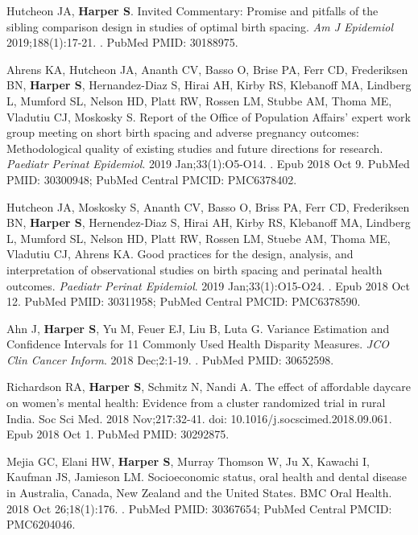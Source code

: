\documentclass[
  letterpaper,
  DIV=11,
  numbers=noendperiod]{scrartcl}
\begin{document}
\begin{etaremune}
\item Hutcheon JA, \textbf{Harper S}. Invited Commentary: Promise and pitfalls of the sibling comparison design in studies of optimal birth spacing. \emph{Am J Epidemiol} 2019;188(1):17-21. . PubMed PMID: 30188975.

\item Ahrens KA, Hutcheon JA, Ananth CV, Basso O, Brise PA, Ferr CD, Frederiksen BN, \textbf{Harper S}, Hernandez-Diaz S, Hirai AH, Kirby RS, Klebanoff MA, Lindberg L, Mumford SL, Nelson HD, Platt RW, Rossen LM, Stubbe AM, Thoma ME, Vladutiu CJ, Moskosky S. Report of the Office of Population Affairs' expert work group meeting on short birth spacing and adverse pregnancy outcomes: Methodological quality of existing studies and future directions for research. \emph{Paediatr Perinat Epidemiol}. 2019 Jan;33(1):O5-O14. . Epub 2018 Oct 9. PubMed PMID: 30300948; PubMed Central PMCID: PMC6378402.

\item Hutcheon JA, Moskosky S, Ananth CV, Basso O, Briss PA, Ferr CD, Frederiksen BN, \textbf{Harper S}, Hernendez-Diaz S, Hirai AH, Kirby RS, Klebanoff MA, Lindberg L, Mumford SL, Nelson HD, Platt RW, Rossen LM, Stuebe AM, Thoma ME, Vladutiu CJ, Ahrens KA. Good practices for the design, analysis, and interpretation of observational studies on birth spacing and perinatal health outcomes. \emph{Paediatr Perinat Epidemiol}. 2019 Jan;33(1):O15-O24. . Epub 2018 Oct 12. PubMed PMID: 30311958; PubMed Central PMCID: PMC6378590.

\item Ahn J, \textbf{Harper S}, Yu M, Feuer EJ, Liu B, Luta G. Variance Estimation and Confidence Intervals for 11 Commonly Used Health Disparity Measures. \emph{JCO Clin Cancer Inform}. 2018 Dec;2:1-19. . PubMed PMID: 30652598.

\item *Richardson RA, \textbf{Harper S}, Schmitz N, Nandi A. The effect of affordable daycare on women's mental health: Evidence from a cluster randomized trial in rural India. Soc Sci Med. 2018 Nov;217:32-41. doi{: 10.1016/j.socscimed.2018.09.061}. Epub 2018 Oct 1. PubMed PMID: 30292875.

\item Mejia GC, Elani HW, \textbf{Harper S}, Murray Thomson W, Ju X, Kawachi I, Kaufman JS, Jamieson LM. Socioeconomic status, oral health and dental disease in Australia, Canada, New Zealand and the United States. BMC Oral Health. 2018 Oct 26;18(1):176. . PubMed PMID: 30367654; PubMed Central PMCID: PMC6204046.


\end{etaremune}
\end{document}
